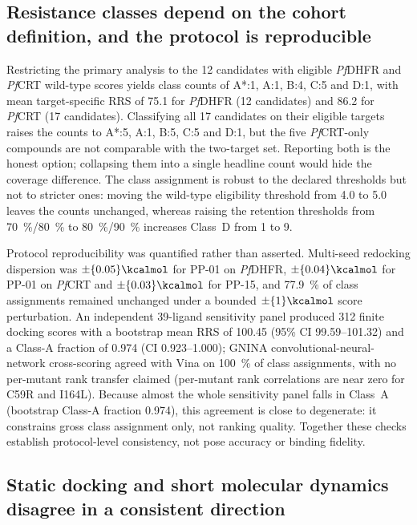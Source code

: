\subsection{Resistance classes depend on the cohort definition, and the protocol is reproducible}

Restricting the primary analysis to the \num{12} candidates with eligible \emph{Pf}DHFR and \emph{Pf}CRT wild-type scores yields class counts of A*:\num{1}, A:\num{1}, B:\num{4}, C:\num{5} and D:\num{1}, with mean target-specific RRS of \num{75.1} for \emph{Pf}DHFR (\num{12} candidates) and \num{86.2} for \emph{Pf}CRT (\num{17} candidates). Classifying all \num{17} candidates on their eligible targets raises the counts to A*:\num{5}, A:\num{1}, B:\num{5}, C:\num{5} and D:\num{1}, but the five \emph{Pf}CRT-only compounds are not comparable with the two-target set. Reporting both is the honest option; collapsing them into a single headline count would hide the coverage difference. The class assignment is robust to the declared thresholds but not to stricter ones: moving the wild-type eligibility threshold from \qty{4.0}{\kcalmol} to \qty{5.0}{\kcalmol} leaves the counts unchanged, whereas raising the retention thresholds from \qty{70}{\percent}/\qty{80}{\percent} to \qty{80}{\percent}/\qty{90}{\percent} increases Class~D from \num{1} to \num{9}.

Protocol reproducibility was quantified rather than asserted. Multi-seed redocking dispersion was $\pm \qty{0.05}{\kcalmol}$ for PP-01 on \emph{Pf}DHFR, $\pm \qty{0.04}{\kcalmol}$ for PP-01 on \emph{Pf}CRT and $\pm \qty{0.03}{\kcalmol}$ for PP-15, and \qty{77.9}{\percent} of class assignments remained unchanged under a bounded $\pm \qty{1}{\kcalmol}$ score perturbation. An independent \num{39}-ligand sensitivity panel produced \num{312} finite docking scores with a bootstrap mean RRS of \num{100.45} (95\% CI \numrange{99.59}{101.32}) and a Class-A fraction of \num{0.974} (CI \numrange{0.923}{1.000}); GNINA convolutional-neural-network cross-scoring agreed with Vina on \qty{100}{\percent} of class assignments, with no per-mutant rank transfer claimed (per-mutant rank correlations are near zero for C59R and I164L). Because almost the whole sensitivity panel falls in Class~A (bootstrap Class-A fraction \num{0.974}), this agreement is close to degenerate: it constrains gross class assignment only, not ranking quality. Together these checks establish protocol-level consistency, not pose accuracy or binding fidelity.

\subsection{Static docking and short molecular dynamics disagree in a consistent direction}

